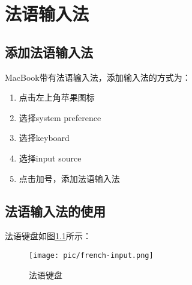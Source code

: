 
\chapter{法语输入法}

\section{添加法语输入法}


MacBook带有法语输入法，添加输入法的方式为：
\begin{enumerate}
\item 点击左上角苹果图标
\item 选择system preference
\item 选择keyboard
\item 选择input source
\item 点击加号，添加法语输入法
\end{enumerate}

\section{法语输入法的使用}
法语键盘如图\ref{fig:french-input}所示：
\begin{figure}[!ht]
  \centering
  \texttt{[image: pic/french-input.png]}
  \caption{法语键盘}
  \label{fig:french-input}
\end{figure}


